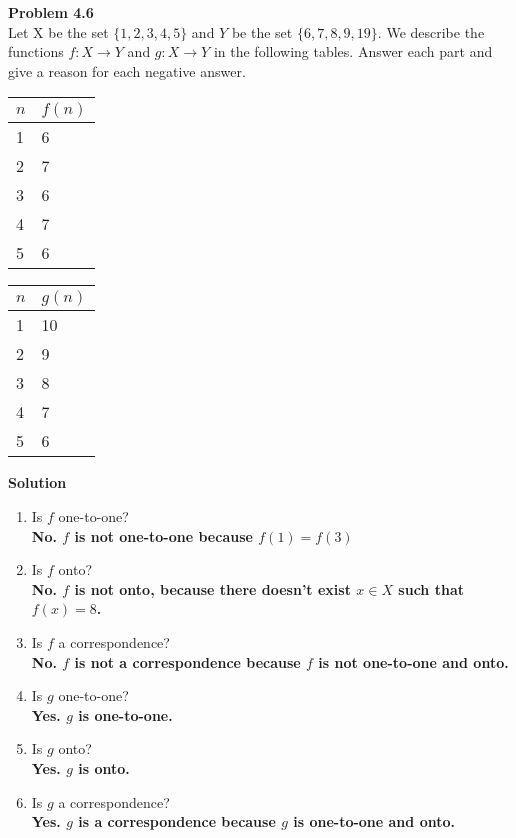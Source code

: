 \documentclass{article}
\newcommand\curl[1]{\{#1\}}
\newcommand{\problem}[1]{\large{\textbf{Problem #1}}\\}
\begin{document}
\problem{4.6}

    Let X be the set $\curl{1,2,3,4,5}$ and $Y$ be the set $\curl{6,7,8,9,19}$. We describe the functions $ f : X \rightarrow Y$ and $g: X \rightarrow Y$
    in the following tables. Answer each part and give a reason for each negative answer.

    \begin{table}[h!]
    \centering
    \begin{tabular}{l|l}
     $n$   & $f(n)$  \\ \hline
     1     & 6 \\
     2     & 7 \\
     3     & 6 \\
     4     & 7 \\
     5     & 6 
    \end{tabular}
    \quad
    \begin{tabular}{l|l}
     $n$& $g(n)$  \\ \hline
     1  & 10 \\
     2  & 9 \\
     3  & 8 \\
     4  & 7 \\
     5  & 6
    \end{tabular}
    \end{table}
    
    \textbf{Solution}

    \begin{enumerate}[1., leftmargin = 0.6cm]
    \itemsep0em
    \item Is $f$ one-to-one?\\
        \textbf{No. $f$ is not one-to-one because $f(1) = f(3)$}
    \item Is $f$ onto?\\
        \textbf{No. $f$ is not onto, because there doesn't exist $x \in X$ such that $f(x) = 8$.}
    \item Is $f$ a correspondence?\\
        \textbf{No. $f$ is not a correspondence because $f$ is not one-to-one and onto.}
    \item Is $g$ one-to-one? \\
        \textbf{Yes. $g$ is one-to-one.}
    \item Is $g$ onto?\\
        \textbf{Yes. $g$ is onto.}
    \item Is $g$ a correspondence?\\
        \textbf{Yes. $g$ is a correspondence because $g$ is one-to-one and onto.}
    \end{enumerate}
\end{document}
